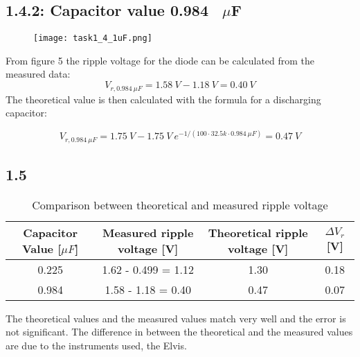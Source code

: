 \subsection*{1.4.2: Capacitor value 0.984 \ \textbf{$\mu$}F}    

    \begin{figure}[h!]
        \centering
        \texttt{[image: task1\_4\_1uF.png]}
    \end{figure}
    
    From figure 5 the ripple voltage for the diode can be calculated from the measured data: $$V_{r,0.984 \ \mu F} = 1.58 \ V - 1.18 \ V = 0.40 \ V $$
     The theoretical value is then calculated with the formula for a discharging capacitor:
    
     $$ V_{r,0.984 \ \mu F} = 1.75 \ V - 1.75 \ V \ e^{-1/(100 \cdot 32.5k \cdot 0.984 \ \mu F)} = 0.47 \ V $$


    

\subsection*{1.5}
    
   \begin{table}[htbp]
     \centering
       \begin{tabular}{c|c|c|c}
       Capacitor Value [$\mu F$] & Measured ripple voltage [V] & Theoretical ripple voltage [V] & $\Delta V_r$ [V] \\
       \hline
       0.225         &     1.62 - 0.499 = 1.12        & 1.30 & 0.18 \\
       0.984         &     1.58 - 1.18 = 0.40         & 0.47 & 0.07 \\       
       \end{tabular}%
       \caption{Comparison between theoretical and measured ripple voltage}
     \label{tab:addlabel}%
   \end{table}%

The theoretical values and the measured values match very well and the error is not significant. The difference in between the theoretical and the measured values are due to the instruments used, the Elvis.
    



